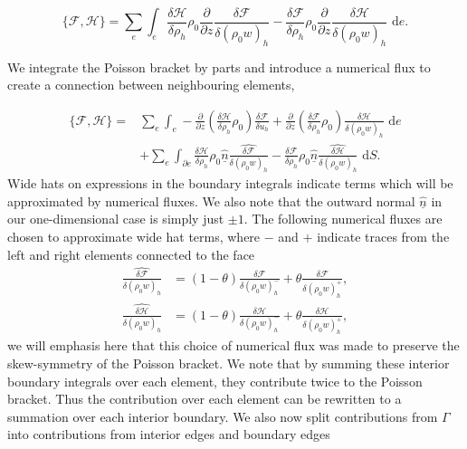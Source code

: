 \documentclass[a4paper,11pt]{article}
\begin{document}
\[ \{ \mathcal{F},  \mathcal{H}\} = \sum_e \int_e \frac{\delta  \mathcal{H}}{\delta \rho_h}\rho_0 \frac{\partial}{\partial z}\frac{\delta  \mathcal{F}}{\delta (\rho_0 w)_h} - \frac{\delta  \mathcal{F}}{\delta \rho_h}\rho_0 \frac{\partial}{\partial z}\frac{\delta  \mathcal{H}}{\delta (\rho_0 w)_h} \text{ d}e.\]

 We integrate the  Poisson bracket by parts and introduce a numerical flux to create a connection between neighbouring elements,

\begin{equation}
\begin{aligned}
 \{ \mathcal{F},  \mathcal{H}\} = & \sum_e \int_e - \frac{\partial}{\partial z}(\frac{\delta  \mathcal{H}}{\delta \rho_h}\rho_0 ) \frac{\delta  \mathcal{F}}{\delta u_h} + \frac{\partial}{\partial z}(\frac{\delta  \mathcal{F}}{\delta \rho_h}\rho_0)\frac{\delta  \mathcal{H}}{\delta (\rho_0 w)_h} \text{ d}e \\
 &+ \sum_e \int_{\partial e }  \frac{\delta  \mathcal{H}}{\delta \rho_h}\rho_0\hat{\underline{n}} \widehat{\frac{\delta  \mathcal{F}}{\delta (\rho_0 w)_h}} - \frac{\delta  \mathcal{F}}{\delta \rho_h}\rho_0\hat{\underline{n}} \widehat{\frac{\delta  \mathcal{H}}{\delta (\rho_0 w)_h}} \text{ d} S. 
 \end{aligned}
 \end{equation}
 Wide hats on expressions in the boundary integrals indicate terms which will be approximated by numerical fluxes. We also note that the outward normal $\hat{\underline{n}}$ in our one-dimensional case is simply just $\pm 1$.
  The  following numerical fluxes are chosen to approximate wide hat terms, where $-$  and $+$ indicate traces from the left and right elements connected to the face
 \begin{equation}
 \begin{aligned}
  \widehat{\frac{\delta  \mathcal{F}}{\delta (\rho_0 w)_h}} &= (1-\theta) \frac{\delta  \mathcal{F}}{\delta (\rho_0 w)_h^-}+ \theta\frac{\delta  \mathcal{F}}{\delta (\rho_0 w)_h^+},  \\
 \widehat{\frac{\delta  \mathcal{H}}{\delta  (\rho_0 w)_h}}&= (1-\theta) \frac{\delta  \mathcal{H}}{\delta (\rho_0 w)_h^-}+ \theta\frac{\delta  \mathcal{H}}{\delta (\rho_0 w)_h^+} ,
 \end{aligned}
 \end{equation}
 we will emphasis here that this choice of numerical flux was made to preserve the skew-symmetry of the Poisson bracket.  We note that by summing these interior boundary integrals over each element, they contribute twice to the Poisson bracket. Thus the contribution over each element can be rewritten to a summation over each interior boundary. We also now split contributions from $\Gamma$ into contributions from interior edges and boundary edges
\end{document}
